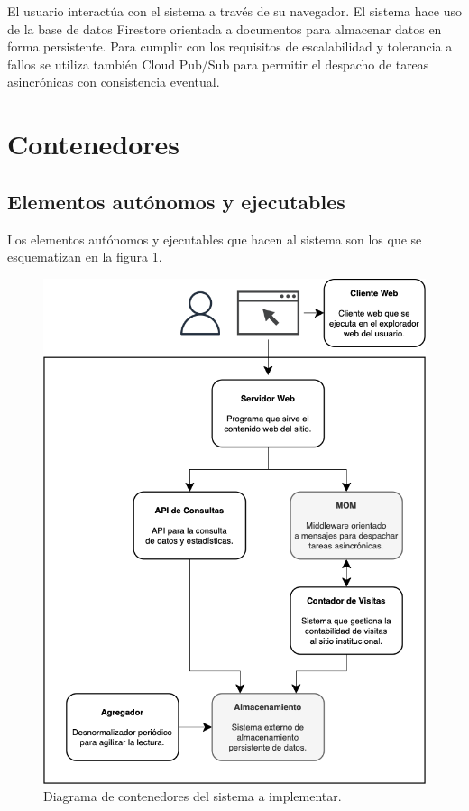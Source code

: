 \documentclass[11pt]{scrartcl}
\begin{document}
El usuario interactúa con el sistema a través de su navegador. El sistema hace uso de la base de datos Firestore orientada a documentos para almacenar datos en forma persistente. Para cumplir con los requisitos de escalabilidad y tolerancia a fallos se utiliza también Cloud Pub/Sub para permitir el despacho de tareas asincrónicas con consistencia eventual.

\section{Contenedores}\label{sec:containers}

\subsection{Elementos autónomos y ejecutables}

Los elementos autónomos y ejecutables que hacen al sistema son los que se esquematizan en la figura \ref{fig:containers}.

\begin{figure}
\centering
\includegraphics[scale=0.6]{img/containers}
\caption{Diagrama de contenedores del sistema a implementar.}
\label{fig:containers}
\end{figure}
\end{document}
